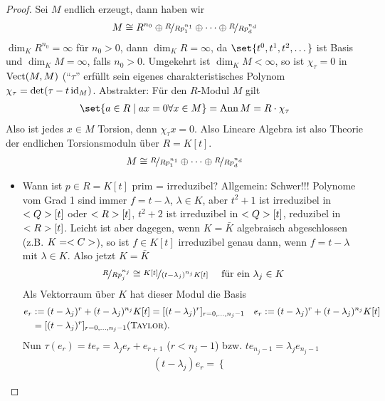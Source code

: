 \begin{proof}
	Sei $M$ endlich erzeugt, dann haben wir
	\begin{align*}
		M \cong R^{n_0} \oplus \lnkset{R}{Rp_{1}^{n_1}} \oplus \cdots \oplus \lnkset{R}{Rp_{d}^{n_d}}
	\end{align*}
	$\dim_K R^{n_0} = \infty$ für $n_0 > 0$, dann $\dim_K R = \infty$, da $\set{t^0, t^1, t^2, \dots}$ ist Basis und $\dim_K M = \infty$, falls $n_0 > 0$. Umgekehrt ist $\dim_K M < \infty$, so ist $\chi_{\tau} = 0$ in $\operatorname{Vect}(M,M)$ (``$\tau$'' erfüllt sein eigenes charakteristisches Polynom $\chi_{\tau} = \det(\tau - t\operatorname{id}_M)$. Abstrakter: Für den $R$-Modul $M$ gilt
	\begin{align*}
		\set{a \in R \mid ax = 0 \forall x \in M} = \Ann M = R \cdot \chi_{\tau}
	\end{align*}
	Also ist jedes $x \in M$ Torsion, denn $\chi_{\tau} x = 0$. Also Lineare Algebra ist also Theorie der endlichen Torsionsmoduln über $R = K[t]$.
	\begin{align*}
		M \cong \lnkset{R}{Rp_{1}^{n_1}} \oplus \cdots \oplus \lnkset{R}{Rp_{d}^{n_d}}
	\end{align*}
	\begin{itemize}
		\item Wann ist $p \in R = K[t]$ prim = irreduzibel? Allgemein: Schwer!!! Polynome vom Grad 1 sind immer $f = t-\lambda$, $\lambda \in K$, aber $t^2 +1$ ist irreduzibel in $<Q>[t]$ oder $<R>[t]$, $t^2+2$ ist irreduzibel in $<Q>[t]$, reduzibel in $<R>[t]$. Leicht ist aber dagegen, wenn $K = \bar{K}$ algebraisch abgeschlossen (z.B. $K = <C>$), so ist $f \in K[t]$ irreduzibel genau dann, wenn $f = t - \lambda$ mit $\lambda \in K$. Also jetzt $K = \bar{K}$
		\begin{align*}
			\lnkset{R}{Rp_{j}^{n_j}} \cong \lnkset{K[t]}{(t-\lambda_j)^{n_j}K[t]} \quad \text{ für ein }\lambda_j \in K
		\end{align*}
		Als Vektorraum über $K$ hat dieser Modul die Basis
		\begin{align*}
			e_r &:= (t-\lambda_j)^r + (t-\lambda_j)^{n_j}K[t] = [(t-\lambda_j)^r]_{r = 0, \dots, n_j -1}\quad e_r := (t-\lambda_j)^r + (t-\lambda_j)^{n_j}K[t]\\
			&= [(t-\lambda_j)^r]_{r = 0, \dots, n_j -1} (\textsc{Taylor}).
		\end{align*} 
		Nun $\tau(e_r) = te_r = \lambda_j e_r + e_{r+1}$ ($r < n_j -1$) bzw. $t e_{n_j - 1} = \lambda_j e_{n_j -1}$
		\begin{align*}
			(t-\lambda_j)e_r = \begin{cases}

\end{cases}
\end{align*}
\end{itemize}
\end{proof}
